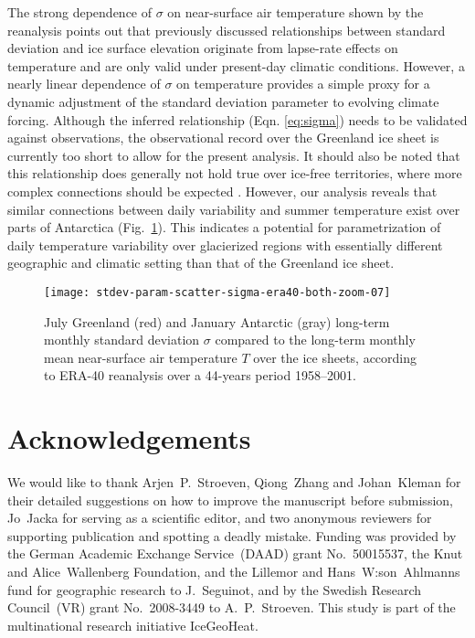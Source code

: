 \documentclass[review]{igs}
\begin{document}
The strong dependence of $\sigma$ on near-surface air temperature shown by the reanalysis points out that previously discussed relationships between standard deviation and ice surface elevation \citep{fausto-etal-2009,fausto-etal-2011} originate from lapse-rate effects on temperature and are only valid under present-day climatic conditions. However, a nearly linear dependence of $\sigma$ on temperature provides a simple proxy for a dynamic adjustment of the standard deviation parameter to evolving climate forcing. Although the inferred relationship (Eqn. \ref{eq:sigma}) needs to be validated against observations, the observational record over the Greenland ice sheet is currently too short to allow for the present analysis. It should also be noted that this relationship does generally not hold true over ice-free territories, where more complex connections should be expected \citep{seguinot-2013}. However, our analysis reveals that similar connections between daily variability and summer temperature exist over parts of Antarctica (Fig.~\ref{fig:both}). This indicates a potential for parametrization of daily temperature variability over glacierized regions with essentially different geographic and climatic setting than that of the Greenland ice sheet.

\begin{figure}
    \centering\texttt{[image: stdev-param-scatter-sigma-era40-both-zoom-07]}
    \caption{July Greenland (red) and January Antarctic (gray) long-term monthly standard deviation $\sigma$ compared to the long-term monthly mean near-surface air temperature $T$ over the ice sheets, according to ERA-40 reanalysis \citep{uppala-etal-2005} over a 44-years period 1958–2001.}
    \label{fig:both}
\end{figure}


\section{Acknowledgements}

We would like to thank Arjen~P.~Stroeven, Qiong~Zhang and Johan~Kleman for their detailed suggestions on how to improve the manuscript before submission, Jo~Jacka for serving as a scientific editor, and two anonymous reviewers for supporting publication and spotting a deadly mistake. Funding was provided by the German Academic Exchange Service~(DAAD) grant No.~50015537, the Knut and Alice~Wallenberg Foundation, and the Lillemor and Hans~W:son~Ahlmanns fund for geographic research to J.~Seguinot, and by the Swedish Research Council~(VR) grant No.~2008-3449 to A.~P.~Stroeven. This study is part of the multinational research initiative IceGeoHeat.



\end{document}
